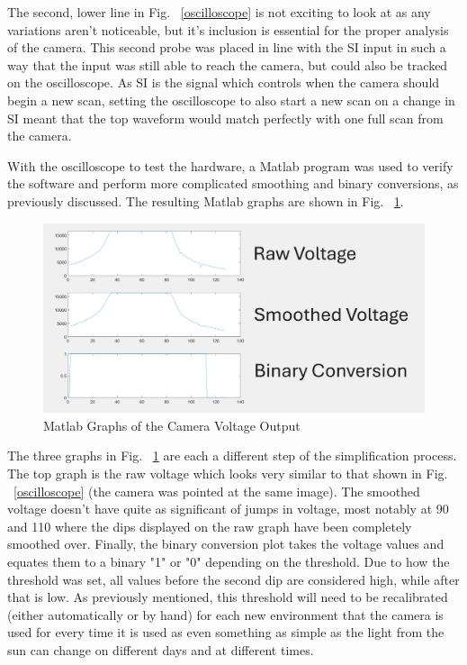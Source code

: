 \documentclass[conference]{IEEEtran}
\begin{document}
The second, lower line in Fig. ~\ref{oscilloscope} is not exciting to look at as any variations aren't noticeable, but it's inclusion is essential for the proper analysis of the camera. This second probe was placed in line with the SI input in such a way that the input was still able to reach the camera, but could also be tracked on the oscilloscope. As SI is the signal which controls when the camera should begin a new scan, setting the oscilloscope to also start a new scan on a change in SI meant that the top waveform would match perfectly with one full scan from the camera.

With the oscilloscope to test the hardware, a Matlab program was used to verify the software and perform more complicated smoothing and binary conversions, as previously discussed. The resulting Matlab graphs are shown in Fig. ~\ref{matlab}.

\begin{figure}
    \centering
    \includegraphics[width=\linewidth]{images/part3matlab.png}
    \caption{Matlab Graphs of the Camera Voltage Output}
    \label{matlab}
\end{figure}

The three graphs in Fig. ~\ref{matlab} are each a different step of the simplification process. The top graph is the raw voltage which looks very similar to that shown in Fig. ~\ref{oscilloscope} (the camera was pointed at the same image). The smoothed voltage doesn't have quite as significant of jumps in voltage, most notably at 90 and 110 where the dips displayed on the raw graph have been completely smoothed over. Finally, the binary conversion plot takes the voltage values and equates them to a binary "1" or "0" depending on the threshold. Due to how the threshold was set, all values before the second dip are considered high, while after that is low. As previously mentioned, this threshold will need to be recalibrated (either automatically or by hand) for each new environment that the camera is used for every time it is used as even something as simple as the light from the sun can change on different days and at different times.
\end{document}
